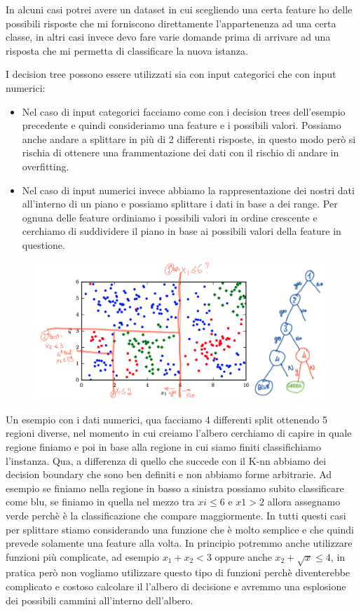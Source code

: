 \documentclass[14pt]{extreport}
\begin{document}
		In alcuni casi potrei avere un dataset in cui scegliendo una certa feature ho delle possibili risposte che mi forniscono direttamente l’appartenenza ad una certa classe, in altri casi invece devo fare varie domande prima di arrivare ad una risposta che mi permetta di classificare la nuova istanza.

		I decision tree possono essere utilizzati sia con input categorici che con input numerici:

		\begin{itemize}
			\item Nel caso di input categorici facciamo come con i decision trees dell’esempio precedente e quindi consideriamo una feature e i possibili valori. Possiamo anche andare a splittare in più di 2 differenti risposte, in questo modo però si rischia di ottenere una frammentazione dei dati con il rischio di andare in overfitting.
			\item Nel caso di input numerici invece abbiamo la rappresentazione dei nostri dati all’interno di un piano e possiamo splittare i dati in base a dei range. Per ognuna delle feature ordiniamo i possibili valori in ordine crescente e cerchiamo di suddividere il piano in base ai possibili valori della feature in questione.
			\end{itemize}


			\begin{figure}[H] 
				\centering
				\includegraphics[width=0.7\linewidth]{479.jpeg}
				\end{figure}

				Un esempio con i dati numerici, qua facciamo 4 differenti split ottenendo 5 regioni diverse, nel momento in cui creiamo l’albero cerchiamo di capire in quale regione finiamo e poi in base alla regione in cui siamo finiti classifichiamo l’instanza. 
				Qua, a differenza di quello che succede con il K-nn abbiamo dei decision boundary che sono ben definiti e non abbiamo forme arbitrarie.
				Ad esempio se finiamo nella regione in basso a sinistra possiamo subito classificare come blu, se finiamo in quella nel mezzo tra $xi \leq 6$ e $x1>2$ allora assegnamo verde perchè è la classificazione che compare maggiormente.
				In tutti questi casi per splittare stiamo considerando una funzione che è molto semplice e che quindi prevede solamente una feature alla volta.
				In principio potremmo anche utilizzare funzioni più complicate, ad esempio $x_1+x_2 < 3$ oppure anche $x_2 +\sqrt{x} \leq 4$, in pratica però non vogliamo utilizzare questo tipo di funzioni perchè diventerebbe complicato e costoso calcolare il l’albero di decisione e avremmo una esplosione dei possibili cammini all’interno dell’albero.
				
\end{document}
